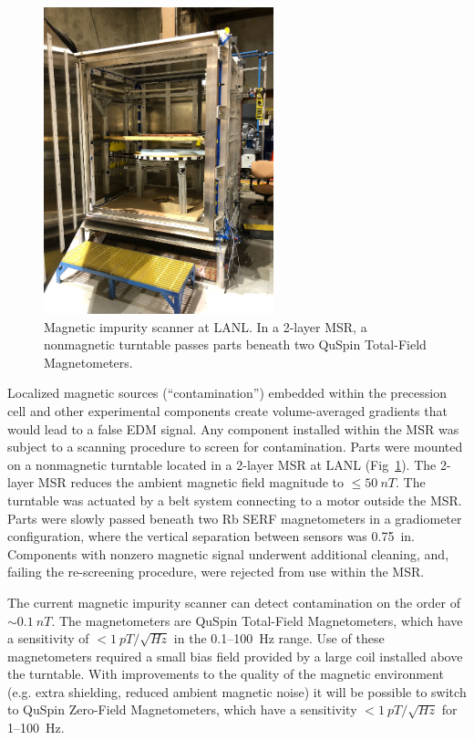 \begin{figure}
    \centering
    \includegraphics[height=3.5in]{figures/magnetic_impurity_scanner.png}
    \caption
      {Magnetic impurity scanner at LANL. In a 2-layer MSR, a nonmagnetic turntable passes parts beneath two QuSpin Total-Field Magnetometers.}
    \label{fig:magnetic_impurity_scanner}
\end{figure}

Localized magnetic sources (``contamination'') embedded within the precession cell and other experimental components create volume-averaged gradients that would lead to a false EDM signal. Any component installed within the MSR was subject to a scanning procedure to screen for contamination. Parts were mounted on a nonmagnetic turntable located in a 2-layer MSR at LANL (Fig~\ref{fig:magnetic_impurity_scanner}). The 2-layer MSR reduces the ambient magnetic field magnitude to $\leq \qty{50}{nT}$. The turntable was actuated by a belt system connecting to a motor outside the MSR. Parts were slowly passed beneath two Rb SERF magnetometers in a gradiometer configuration, where the vertical separation between sensors was \qty{0.75}{in}. Components with nonzero magnetic signal underwent additional cleaning, and, failing the re-screening procedure, were rejected from use within the MSR.

The current magnetic impurity scanner can detect contamination on the order of $\sim\qty{0.1}{nT}$. The magnetometers are QuSpin Total-Field Magnetometers, which have a sensitivity of $<\qty{1}{pT\per\sqrt{Hz}}$ in the 0.1--\qty{100}{\hertz} range. Use of these magnetometers required a small bias field provided by a large coil installed above the turntable. With improvements to the quality of the magnetic environment (e.g. extra shielding, reduced ambient magnetic noise) it will be possible to switch to QuSpin Zero-Field Magnetometers, which have a sensitivity $<\qty{1}{pT\per\sqrt{Hz}}$ for 1--\qty{100}{\hertz}.

